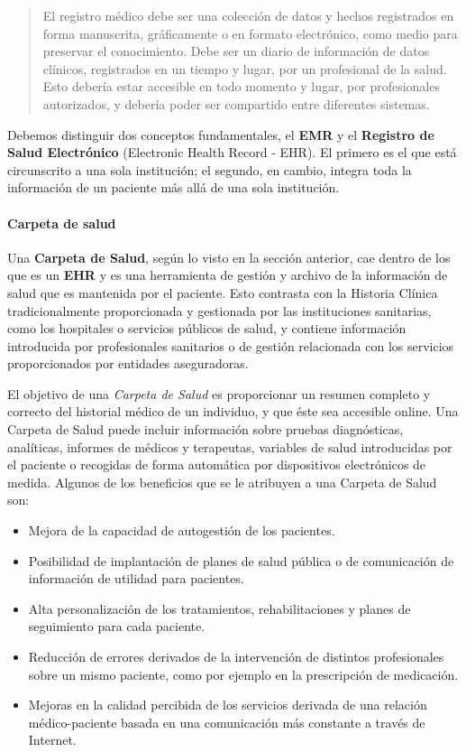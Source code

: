 \begin{quote}
El registro médico debe ser una colección de datos y hechos registrados en forma manuscrita, gráficamente o en formato electrónico, como medio para preservar el conocimiento.
Debe ser un diario de información de datos clínicos, registrados en un tiempo y lugar, por un profesional de la salud. Esto debería estar accesible en todo momento y lugar, por profesionales autorizados, y debería poder ser compartido entre diferentes sistemas.
\end{quote}

Debemos distinguir dos conceptos fundamentales, el \textbf{EMR} y el \textbf{Registro de Salud Electrónico} (Electronic Health Record - EHR).
El primero es el que está circunscrito a una sola institución; el segundo, en cambio, integra toda la información de un paciente más allá de una sola institución.

\paragraph{Carpeta de salud}

Una \textbf{Carpeta de Salud}, según lo visto en la sección anterior, cae dentro de los que es un \textbf{EHR} y es una herramienta de gestión y archivo de la información de salud que es mantenida por el paciente.
Esto contrasta con la Historia Clínica tradicionalmente proporcionada y gestionada por las instituciones sanitarias,
como los hospitales o servicios públicos de salud,
y contiene información introducida por profesionales sanitarios o de gestión relacionada con los servicios proporcionados por entidades aseguradoras.

El objetivo de una \textit{Carpeta de Salud} es proporcionar un resumen completo y correcto del historial médico de un individuo, y que éste sea accesible online.
Una Carpeta de Salud puede incluir información sobre pruebas diagnósticas, analíticas, informes de médicos y terapeutas,
 variables de salud introducidas por el paciente o recogidas de forma automática por dispositivos electrónicos de medida.
Algunos de los beneficios que se le atribuyen a una Carpeta de Salud son:
	\begin{itemize}
        \item Mejora de la capacidad de autogestión de los pacientes.
	    \item Posibilidad de implantación de planes de salud pública o de comunicación de información de utilidad para pacientes.
	    \item Alta personalización de los tratamientos, rehabilitaciones y planes de seguimiento para cada paciente.
	    \item Reducción de errores derivados de la intervención de distintos profesionales sobre un mismo paciente, como por ejemplo en la prescripción de medicación.
	    \item Mejoras en la calidad percibida de los servicios derivada de una relación médico-paciente basada en una comunicación más constante a través de Internet.
	\end{itemize}


